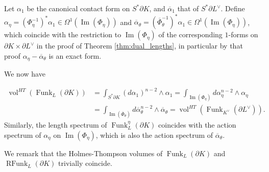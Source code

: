 \documentclass[reqno,10pt]{amsart}
\newcounter{mp}
\DeclareMathOperator{\vol}{vol}
\DeclareMathOperator{\Image}{Im}
\DeclareMathOperator{\Funk}{Funk}
\DeclareMathOperator{\RFunk}{RFunk}
\newcommand{\R}{\mathbb{R}}
\begin{document}
{Let $\alpha_1$ be the canonical contact form on $S^*\partial K$, and $\overline\alpha_1$ that of $S^*\partial L^\vee$. 
Define $\alpha_\eta =(\Phi_\eta^{-1})^*\alpha_1\in\Omega^1(\Image(\Phi_\eta))$ and $\overline\alpha_\theta =(\overline\Phi_\theta^{-1})^*\alpha_1\in\Omega^1(\Image(\Phi_\eta))$, which coincide with the restriction to $\Image(\Phi_\eta)$ of the corresponding $1$-forms on $\partial K\times\partial L^\vee$ in the proof of Theorem \ref{thm:dual_lengths}, in particular by that proof $\alpha_\eta-\overline\alpha_\theta$ is an exact form.

We now have

 \begin{align*}\vol^{HT}(\Funk_L(\partial K))&=\int_{S^*\partial K}(d\alpha_1)^{n-2}\wedge\alpha_1=\int_{\Image(\Phi_\eta)}d\alpha_\eta^{n-2}\wedge\alpha_\eta\\&=\int_{\Image(\overline\Phi_\theta)}d\overline\alpha_\theta^{n-2}\wedge\overline\alpha_\theta=\vol^{HT}(\Funk_{K^\vee}(\partial L^\vee)).\end{align*}
 Similarly, the length spectrum of $\Funk^\eta_L(\partial K)$ coincides with the action spectrum of $\alpha_\eta$ on $\Image(\Phi_\eta)$, which is also the action spectrum of $\overline \alpha_\theta$.
%
%
%
\endproof
}
We remark that the Holmes-Thompson volumes of $\Funk_L(\partial K)$ and $\RFunk_L(\partial K)$ trivially coincide.
\end{document}
